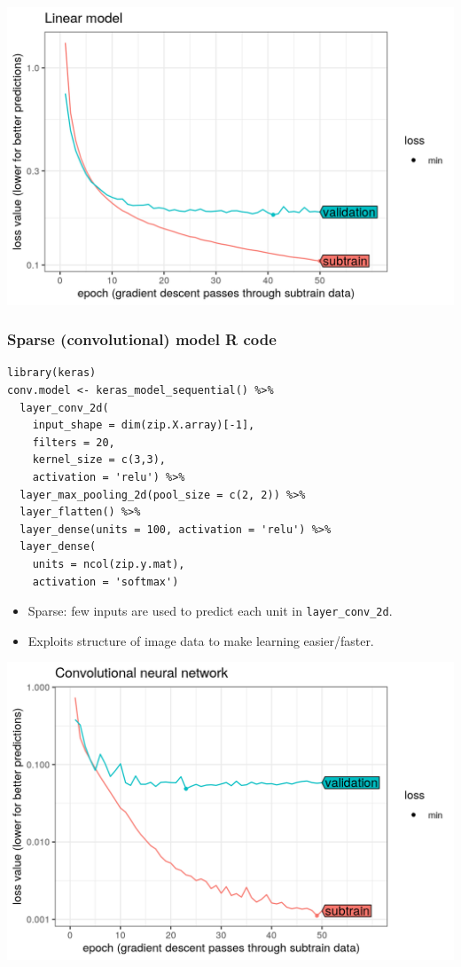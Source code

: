 \documentclass{beamer}
\begin{document}
\begin{frame}
  \includegraphics[width=\textwidth]{figure-validation-loss-linear}
\end{frame}
 
\begin{frame}[fragile]
  \frametitle{Sparse (convolutional) model R code}

\begin{verbatim}
library(keras)
conv.model <- keras_model_sequential() %>%
  layer_conv_2d(
    input_shape = dim(zip.X.array)[-1],
    filters = 20,
    kernel_size = c(3,3),
    activation = 'relu') %>% 
  layer_max_pooling_2d(pool_size = c(2, 2)) %>%
  layer_flatten() %>%
  layer_dense(units = 100, activation = 'relu') %>% 
  layer_dense(
    units = ncol(zip.y.mat), 
    activation = 'softmax')
\end{verbatim}

  \begin{itemize}
  \item Sparse: few inputs are used to predict each unit in
    \texttt{layer\_conv\_2d}.
  \item Exploits structure of image data to make learning
    easier/faster.
  \end{itemize}

\end{frame}
 
\begin{frame}
  \includegraphics[width=\textwidth]{figure-validation-loss-conv}
\end{frame}
 
\end{document}
